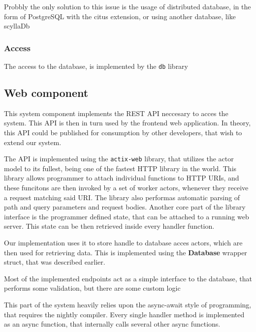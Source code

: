 Probbly the only solution to this issue is the usage of distributed database, in the form of PostgreSQL with the
citus extension, or using another database, like scyllaDb

\subsubsection{Access}
The access to the database, is implemented by the \verb|db| library





\subsection{Web component}
This system component implements the REST API neccesary to acces the system. This API is then
in turn used by the frontend web application. In theory, this API could be published for consumption by
other developers, that wish to extend our system.

The API is implemented using the \verb|actix-web| library, that utilizes the actor model to its fullest,
being one of the fastest HTTP library in the world. This library
allows programmer to attach individual functions to HTTP URIs, and these funcitons are then invoked by a
set of worker actors, whenever they receive a request matching said URI. The library also performas automatic parsing
of path and query parameters and request bodies. Another core part of the library interface is the programmer defined
state, that can be attached to a running web server. This state can be then retrieved inside every handler function.

Our implementation uses it to store handle to database acces actors, which are then used for retrieving data.
This is implemented using the \textbf{Database} wrapper struct, that was described earlier.

Most of the implemented endpoints act as a simple interface to the database, that performs some validation, but there
are some custom logic

This part of the system heavily relies upon the async-await style of programming, that requires the nightly compiler.
Every single handler method is implemented as an async function, that internally calls several other async functions.


